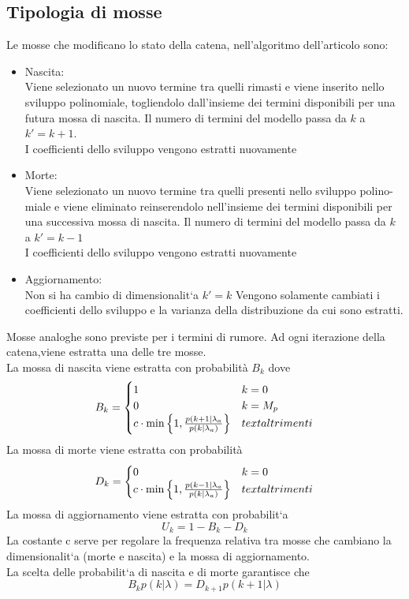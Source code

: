 \subsection{Tipologia di mosse}
Le mosse che modificano lo stato della catena, nell’algoritmo dell’articolo sono:
\begin{itemize}
\item Nascita:\\
Viene selezionato un nuovo termine tra quelli rimasti e viene inserito nello
sviluppo polinomiale, togliendolo dall’insieme dei termini disponibili per una
futura mossa di nascita. Il numero di termini del modello passa da $k$ a $k' =
k + 1$.\\
I coefficienti dello sviluppo vengono estratti nuovamente
\item Morte:\\
Viene selezionato un nuovo termine tra quelli presenti nello sviluppo polino-
miale e viene eliminato reinserendolo nell’insieme dei termini disponibili per
una successiva mossa di nascita. Il numero di termini del modello passa da $k$
a $k' = k-1$\\
I coefficienti dello sviluppo vengono estratti nuovamente
\item Aggiornamento:\\
Non si ha cambio di dimensionalit`a $k'=k$
Vengono solamente cambiati i coefficienti dello sviluppo e la varianza della
distribuzione da cui sono estratti.
\end{itemize}
Mosse analoghe sono previste per i termini di rumore.
Ad ogni iterazione della catena,viene estratta una delle tre mosse.\\
La mossa di nascita viene estratta con probabilità $B_k$ dove
\begin{equation}
B_k=\begin{cases}
1 & k=0\\
0 & k=M_p\\
c\cdot\min\left\lbrace 1,\frac{p(k+1|\lambda_a}{p(k|\lambda_a)}\right\rbrace & text{altrimenti}
\end{cases}
\end{equation}
La mossa di morte viene estratta con probabilità
\begin{equation}
D_k=\begin{cases}
0 & k=0\\
c\cdot\min\left\lbrace 1,\frac{p(k-1|\lambda_a}{p(k|\lambda_a)}\right\rbrace & text{altrimenti}
\end{cases}
\end{equation}
La mossa di aggiornamento viene estratta con probabilit`a
\begin{equation}
U_k=1-B_k-D_k
\end{equation}
La costante c serve per regolare la frequenza relativa tra mosse che cambiano la
dimensionalit`a (morte e nascita) e la mossa di aggiornamento.\\
La scelta delle probabilit`a di nascita e di morte garantisce che
\begin{equation}
B_k p(k|\lambda)=D_{k+1}  p(k+1|\lambda) \label{equilibr_dimensi}
\end{equation}

